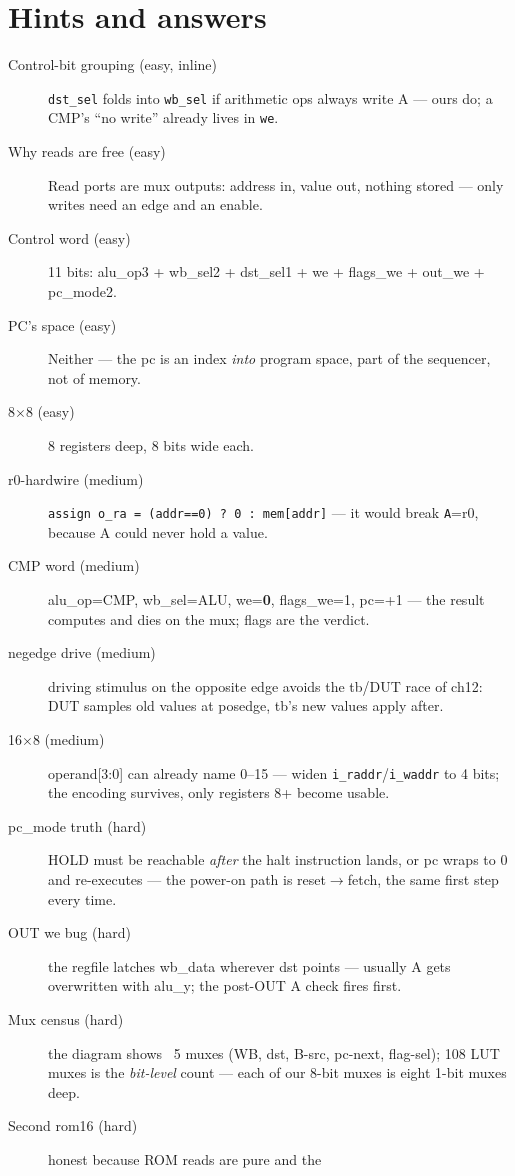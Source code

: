 \section*{Hints and answers}
\begin{description}
\item[Control-bit grouping (easy, inline)] \texttt{dst\_sel} folds
into \texttt{wb\_sel} if arithmetic ops always write A --- ours do;
a CMP's ``no write'' already lives in \texttt{we}.
\item[Why reads are free (easy)] Read ports are mux outputs: address
in, value out, nothing stored --- only writes need an edge and an
enable.
\item[Control word (easy)] 11 bits: alu\_op3 + wb\_sel2 + dst\_sel1 +
we + flags\_we + out\_we + pc\_mode2.
\item[PC's space (easy)] Neither --- the pc is an index
\emph{into} program space, part of the sequencer, not of memory.
\item[8$\times$8 (easy)] 8 registers deep, 8 bits wide each.
\item[r0-hardwire (medium)] \texttt{assign o\_ra = (addr==0) ? 0 :
mem[addr]} --- it would break \texttt{A}=r0, because A could never
hold a value.
\item[CMP word (medium)] alu\_op=CMP, wb\_sel=ALU, we=\textbf{0},
flags\_we=1, pc=+1 --- the result computes and dies on the mux;
flags are the verdict.
\item[negedge drive (medium)] driving stimulus on the opposite edge
avoids the tb/DUT race of ch12: DUT samples old values at posedge,
tb's new values apply after.
\item[16$\times$8 (medium)] operand[3:0] can already name 0--15 ---
widen \texttt{i\_raddr}/\texttt{i\_waddr} to 4 bits; the encoding
survives, only registers 8+ become usable.
\item[pc\_mode truth (hard)] HOLD must be reachable \emph{after} the
halt instruction lands, or pc wraps to 0 and re-executes --- the
power-on path is reset$\to$fetch, the same first step every time.
\item[OUT we bug (hard)] the regfile latches wb\_data wherever dst
points --- usually A gets overwritten with alu\_y; the post-OUT A
check fires first.
\item[Mux census (hard)] the diagram shows ~5 muxes (WB, dst, B-src,
pc-next, flag-sel); 108 LUT muxes is the \emph{bit-level} count ---
each of our 8-bit muxes is eight 1-bit muxes deep.
\item[Second rom16 (hard)] honest because ROM reads are pure and the

\end{description}
